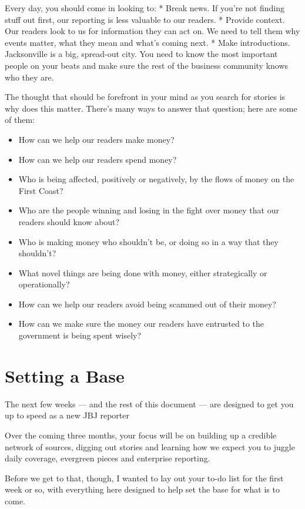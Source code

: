 \documentclass[
  11pt,
  american,
  letterpaperpaper,
  extrafontsizes,onecolumn,openright
  ]{memoir}
\providecommand{\tightlist}{%
  \setlength{\itemsep}{0pt}\setlength{\parskip}{0pt}}
\begin{document}
Every day, you should come in looking to:
* Break news. If you're not finding stuff out first, our reporting is less valuable to our readers.
* Provide context. Our readers look to us for information they can act on. We need to tell them why events matter, what they mean and what's coming next.
* Make introductions. Jacksonville is a big, spread-out city. You need to know the most important people on your beats and make sure the rest of the business community knows who they are.

The thought that should be forefront in your mind as you search for stories is why does this matter. There's many ways to answer that question; here are some of them:

\begin{itemize}
\tightlist
\item
  How can we help our readers make money?
\item
  How can we help our readers spend money?
\item
  Who is being affected, positively or negatively, by the flows of money on the First Coast?
\item
  Who are the people winning and losing in the fight over money that our readers should know about?
\item
  Who is making money who shouldn't be, or doing so in a way that they shouldn't?
\item
  What novel things are being done with money, either strategically or operationally?
\item
  How can we help our readers avoid being scammed out of their money?
\item
  How can we make sure the money our readers have entrusted to the government is being spent wisely?
\end{itemize}

\hypertarget{setting-a-base}{%
\chapter{Setting a Base}\label{setting-a-base}}

The next few weeks --- and the rest of this document --- are designed to get you up to speed as a new JBJ reporter

Over the coming three months, your focus will be on building up a credible network of sources, digging out stories and learning how we expect you to juggle daily coverage, evergreen pieces and enterprise reporting.

Before we get to that, though, I wanted to lay out your to-do list for the first week or so, with everything here designed to help set the base for what is to come.
\end{document}
